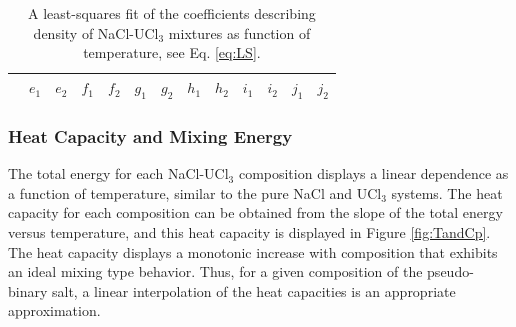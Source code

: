 \documentclass[preprint,3p,10pt,onecolumn,number,sort&compress]{elsarticle}
\begin{document}


\begin{table}[hb!]
\centering
\begin{tabular}{lcccccccccccc}
\hline
\hline
&$e_1$ &$e_2$ &$f_1$ &$f_2$ &$g_1$ &$g_2$ &$h_1$ &$h_2$ &$i_1$ &$i_2$ &$j_1$ &$j_2$ \\
\hline
\hline
\end{tabular}
\caption{A least-squares fit of the coefficients describing density of NaCl-UCl$_3$ mixtures as function of temperature, see Eq. \ref{eq:LS}.}%
\label{table:LS}
\end{table}

\FloatBarrier

\subsubsection{Heat Capacity and Mixing Energy}
The total energy for each NaCl-UCl$_3$ composition displays a linear dependence as a function of temperature, similar to the pure NaCl and UCl$_3$ systems. The heat capacity for each composition can be obtained from the slope of the total energy versus temperature, and this heat capacity is displayed in Figure \ref{fig:TandCp}. The heat capacity displays a monotonic increase with composition that exhibits an ideal mixing type behavior. Thus, for a given composition of the pseudo-binary salt, a linear interpolation of the heat capacities is an appropriate approximation. 
\end{document}
